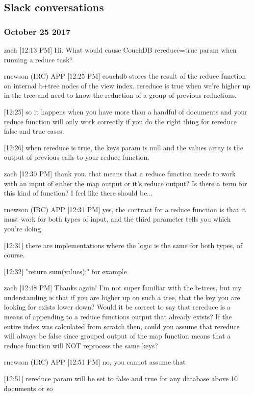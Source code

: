 \subsection{Slack conversations}

\subsubsection*{October 25 2017}
\label{slack-25-oct}
zach [12:13 PM]
Hi. What would cause CouchDB rereduce=true param when running a reduce task?

rnewson (IRC) APP [12:25 PM]
couchdb stores the result of the reduce function on internal b+tree nodes of the view index. rereduce is true when we're higher up in the tree and need to know the reduction of a group of previous reductions.

[12:25]
so it happens when you have more than a handful of documents and your reduce function will only work correctly if you do the right thing for rereduce false and true cases.

[12:26]
when rereduce is true, the keys param is null and the values array is the output of previous calls to your reduce function.

zach [12:30 PM]
thank you. that means that a reduce function needs to work with an input of either the map output or it's reduce output? Is there a term for this kind of function? I feel like there should be...

rnewson (IRC) APP [12:31 PM]
yes, the contract for a reduce function is that it must work for both types of input, and the third parameter tells you which you're doing.

[12:31]
there are implementations where the logic is the same for both types, of course.

[12:32]
"return sum(values);" for example

zach [12:48 PM]
Thanks again! I'm not super familiar with the b-trees, but my understanding is that if you are higher up on such a tree, that the key you are looking for exists lower down? Would it be correct to say that rereduce is a means of appending to a reduce functions output that already exists? If the entire index was calculated from scratch then, could you assume that rereduce will always be false since grouped output of the map function means that a reduce function will NOT reprocess the same keys?

rnewson (IRC) APP [12:51 PM]
no, you cannot assume that

    [12:51]
rereduce param will be set to false and true for any database above 10 documents or so

